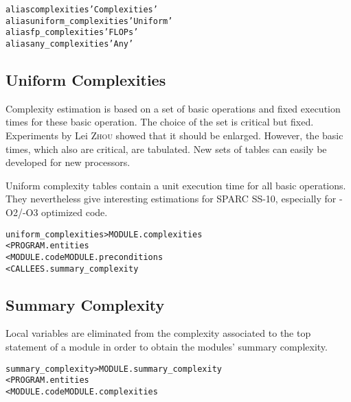 \documentclass[a4paper]{report}
\newenvironment{PipsMake}{\begin{alltt}}{\end{alltt}}
\newenvironment{PipsPass}[1]{\label{pass:#1}}{}
\begin{document}
\begin{PipsMake}
alias complexities      'Complexities'
alias uniform_complexities      'Uniform'
alias fp_complexities   'FLOPs'
alias any_complexities  'Any'
\end{PipsMake}

\subsection{Uniform Complexities}
\label{subsubsection-uniform-complexities}

\begin{PipsPass}{uniform_complexities}
Complexity estimation is based on a set of basic operations and fixed
execution times for these basic operation. The choice of the set is
critical but fixed. Experiments by Lei \textsc{Zhou} showed that it should be
enlarged. However, the basic times, which also are critical, are
tabulated. New sets of tables can easily be developed for new
processors.

Uniform complexity tables contain a unit execution time for all basic
operations. They nevertheless give interesting estimations for SPARC
SS-10, especially for -O2/-O3 optimized code.
\end{PipsPass}

\begin{PipsMake}
uniform_complexities                    > MODULE.complexities
        < PROGRAM.entities
        < MODULE.code MODULE.preconditions
        < CALLEES.summary_complexity
\end{PipsMake}

\subsection{Summary Complexity}
\label{subsubsection-summary-complexity}

\begin{PipsPass}{summary_complexity}
Local variables are eliminated from the complexity associated to the top
statement of a module in order to obtain the modules' summary complexity.
\end{PipsPass}

\begin{PipsMake}
summary_complexity              > MODULE.summary_complexity
        < PROGRAM.entities
        < MODULE.code MODULE.complexities
\end{PipsMake}
\end{document}
